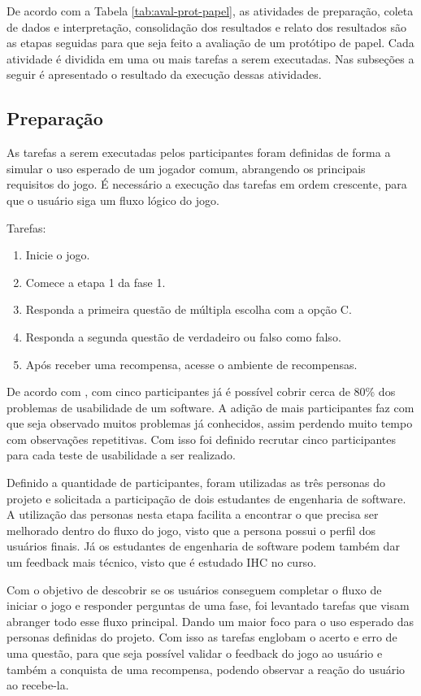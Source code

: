 \begin{apendicesenv}
{\color{textadded}
De acordo com a Tabela \ref{tab:aval-prot-papel}, as atividades de preparação, coleta de dados e interpretação, consolidação dos resultados e relato dos resultados são as etapas seguidas para que seja feito a avaliação de um protótipo de papel. Cada atividade é dividida em uma ou mais tarefas a serem executadas. Nas subseções a seguir é apresentado o resultado da execução dessas atividades.

\subsection{Preparação}

As tarefas a serem executadas pelos participantes foram definidas de forma a simular o uso esperado de um jogador comum, abrangendo os principais requisitos do jogo. É necessário a execução das tarefas em ordem crescente, para que o usuário siga um fluxo lógico do jogo.

Tarefas:
\begin{enumerate}   
    \item Inicie o jogo.
    \item Comece a etapa 1 da fase 1.
    \item Responda a primeira questão de múltipla escolha com a opção C.
    \item Responda a segunda questão de verdadeiro ou falso como falso.
    \item Após receber uma recompensa, acesse o ambiente de recompensas.
\end{enumerate}

De acordo com , com cinco participantes já é possível cobrir cerca de 80\% dos problemas de usabilidade de um software. A adição de mais participantes faz com que seja observado muitos problemas já conhecidos, assim perdendo muito tempo com observações repetitivas. Com isso foi definido recrutar cinco participantes para cada teste de usabilidade a ser realizado.


Definido a quantidade de participantes, foram utilizadas as três personas do projeto e solicitada a participação de dois estudantes de engenharia de software. A utilização das personas nesta etapa facilita a encontrar o que precisa ser melhorado dentro do fluxo do jogo, visto que a persona possui o perfil dos usuários finais. Já os estudantes de engenharia de software podem também dar um feedback mais técnico, visto que é estudado IHC no curso.

Com o objetivo de descobrir se os usuários conseguem completar o fluxo de iniciar o jogo e responder perguntas de uma fase, foi levantado tarefas que visam abranger todo esse fluxo principal. Dando um maior foco para o uso esperado das personas definidas do projeto. Com isso as tarefas englobam o acerto e erro de uma questão, para que seja possível validar o feedback do jogo ao usuário e também a conquista de uma recompensa, podendo observar a reação do usuário ao recebe-la.

}
\end{apendicesenv}
